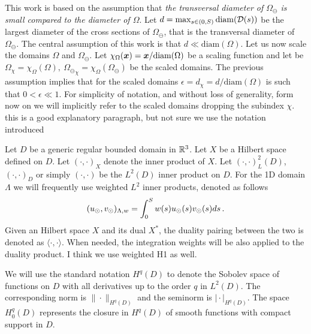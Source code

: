 \documentclass[r]{siamart171218}
\newcommand{\kent}[1]{{\color{blue}#1}}
\begin{document}
This work is based on the assumption that \emph{the transversal diameter of $\Omega_{\ominus}$ is small compared to the diameter of $\Omega$}. 
Let $d= \max_{s \in (0,S)} \mathrm{diam}(\mathcal{D}(s))$ be the largest diameter of the cross sections of $\Omega_{\ominus}$, that is the transversal diameter of $\Omega_{\ominus}$.
The central assumption of this work is that $d \ll \mathrm{diam}(\Omega)$.
Let us now scale the domains $\Omega$ and $\Omega_{\ominus}$.
Let $\chi_{\Omega}(\boldsymbol x) = \boldsymbol x / \mathrm{diam}(\Omega)$ be a scaling function and let be $\Omega_\chi = \chi_{\Omega}(\Omega), \ {\Omega_{\ominus}}_\chi =  \chi_{\Omega}(\Omega_{\ominus})$ be the scaled domains. The previous assumption implies that for the scaled domains $\epsilon = d_\chi = d/\mathrm{diam}(\Omega)$
is such that $0 < \epsilon \ll 1$. For simplicity of notation, and without loss of generality, form now on we will implicitly refer to the scaled domains dropping the subindex $\chi$.
\kent{this is a good explanatory paragraph, but not sure we use the notation introduced}





Let $D$ be a generic regular bounded domain in $\mathbb{R}^3$. 
Let $X$ be a Hilbert space defined on $D$.
Let $(\cdot,\cdot)_X$ denote the inner product of $X$.
Let $(\cdot,\cdot)_L^2(D)$,  $(\cdot,\cdot)_D$ or simply $(\cdot,\cdot)$ be the $L^2(D)$ inner product on $D$.
For the 1D domain $\Lambda$ we will frequently use
weighted $L^2$ inner products, denoted as follows
\begin{equation*}
(u_{\odot},v_{\odot})_{\Lambda,w} = \int_0^S w(s) u_{\odot}(s) v_{\odot}(s) ds\,.
\end{equation*}
Given an Hilbert space $X$ and its dual $X^*$, the duality pairing between the two is denoted as $\langle\cdot,\cdot\rangle$.
When needed, the integration weights will be also applied to the duality product.
\kent{I think we use weighted H1 as well.}

We will use the standard notation $H^q(D)$ to denote the Sobolev space of functions on $D$ with all derivatives up to the order $q$ in $L^2(D)$.
The corresponding norm is $\|\cdot\|_{H^q(D)}$ and the seminorm is $\vert\cdot\vert_{H^q(D)}$.
The space $H^q_0(D)$ represents the closure in $H^q(D)$ of smooth functions with compact support in $D$.
\end{document}
